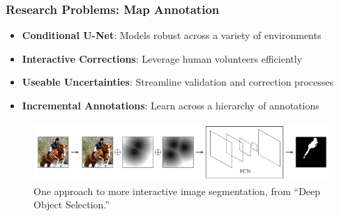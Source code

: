 \documentclass[10pt,mathserif]{beamer}
\begin{document}
\begin{frame}
  \frametitle{Research Problems: Map Annotation}
  \begin{itemize}
  \item \textbf{Conditional U-Net}: Models robust across a variety of environments
  \item \textbf{Interactive Corrections}: Leverage human volunteers efficiently
  \item \textbf{Useable Uncertainties}: Streamline validation and correction processes
  \item \textbf{Incremental Annotations}: Learn across a hierarchy of annotations
  \end{itemize}  
  \begin{figure}[ht]
    \centering
    \includegraphics[width=0.85\paperwidth]{figures/classical_interactive}
    \caption{One approach to more interactive image segmentation, from ``Deep
      Object Selection.'' \label{fig:label} }
  \end{figure}
\end{frame}
\end{document}
